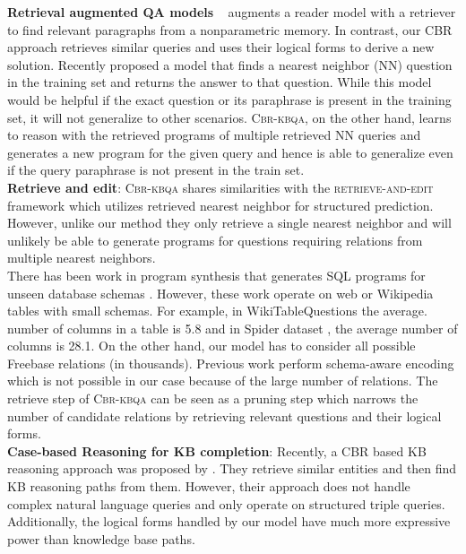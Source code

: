 \documentclass[11pt]{article}
\newcommand{\alg}{\textsc{Cbr-kbqa}\xspace}
\begin{document}
\textbf{Retrieval augmented QA models} ~\cite{chen2017reading,guu2020realm,lewis2020retrieval} augments a reader model with a retriever to find relevant paragraphs from a nonparametric memory. In contrast, our CBR approach retrieves similar queries and uses their logical forms to derive a new solution. Recently \citet{lewis2020question} proposed a model that finds a nearest neighbor (NN) question in the training set and returns the answer to that question. While this model would be helpful if the exact question or its paraphrase is present in the training set, it will not generalize to other scenarios. \alg, on the other hand, learns to reason with the retrieved programs of multiple retrieved NN queries and generates a new program for the given query and hence is able to generalize even if the query paraphrase is not present in the train set.\\
\noindent\textbf{Retrieve and edit}: \alg shares similarities with the \textsc{retrieve-and-edit} framework \cite{hashimoto2018retrieve} which utilizes retrieved nearest neighbor for structured prediction. However, unlike our method they only retrieve a single nearest neighbor and will unlikely be able to generate programs for questions requiring relations from multiple nearest neighbors.\\
 There has been work in program synthesis that generates SQL programs for unseen database schemas \cite{rat-sql,lin2020bridging}. However, these work operate on web or Wikipedia tables with small schemas. For example, in WikiTableQuestions \cite{pasupat2015compositional} the average. number of columns in a table is 5.8 and in Spider dataset \cite{yu2018spider}, the average number of columns is 28.1. On the other hand, our model has to consider all possible Freebase relations (in thousands). Previous work perform schema-aware encoding which is not possible in our case because of the large number of relations. The retrieve step of \alg can be seen as a pruning step which narrows the number of candidate relations by retrieving relevant questions and their logical forms.\\
\noindent\textbf{Case-based Reasoning for KB completion}: Recently, a CBR based KB reasoning approach was proposed by \citet{das2020simple,das-etal-2020-probabilistic}. They retrieve similar entities and then find KB reasoning paths from them. However, their approach does not handle complex natural language queries and only operate on structured triple queries. Additionally, the logical forms handled by our model have much more expressive power than knowledge base paths.\\
\end{document}
